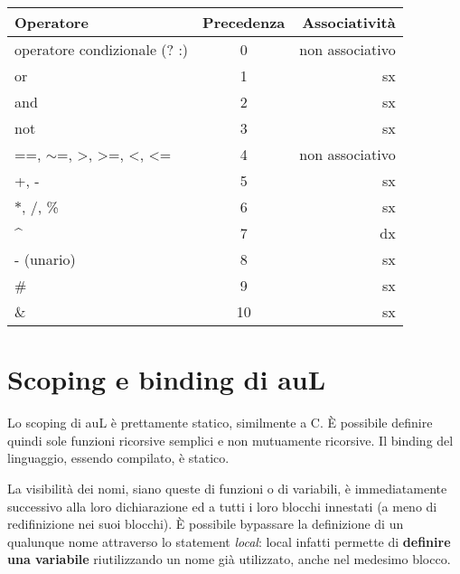 \documentclass{article}
\begin{document}
\begin{table}[h]
\begin{tabular}{lcr}
\hline
Operatore                                                               & Precedenza & Associatività   \\ \hline\hline
operatore condizionale (? :)                                             & 0          & non associativo \\
or                                                                      & 1          & sx              \\
and                                                                     & 2          & sx              \\
not                                                                     & 3          & sx              \\
==, $\sim$=, \textgreater{}, \textgreater{}=, \textless{}, \textless{}= & 4          & non associativo \\
+, -                                                                    & 5          & sx              \\
$*$, /, \%                                                              & 6          & sx              \\
\textasciicircum{}                                                      & 7          & dx              \\
- (unario)                                                              & 8          & sx              \\
\#                                                                      & 9          & sx              \\
\&                                                                      & 10         & sx              \\ \hline
\end{tabular}
\end{table}


\section{Scoping e binding  di auL}
Lo scoping di auL è prettamente statico, similmente a C. È possibile definire quindi sole funzioni ricorsive semplici
e non mutuamente ricorsive. Il binding del linguaggio, essendo compilato, è statico.

La visibilità dei nomi, siano queste di funzioni o di variabili, è immediatamente successivo alla loro dichiarazione 
ed a tutti i loro blocchi innestati (a meno di redifinizione nei suoi blocchi). È possibile bypassare la definizione 
di un qualunque nome attraverso lo statement \textit{local}: local infatti permette di \textbf{definire una variabile} 
riutilizzando un nome già utilizzato, anche nel medesimo blocco.
\end{document}
